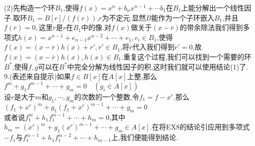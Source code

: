 \documentclass[b5paper]{ctexart}
\begin{document}
(2)先构造一个环$B_1$,使得$f(x)=x^n+b_nx^{n-1}+\cdots b_1$在$B_1$上能分解出一个线性因子.取环$B_1=B[r]/(f(r))$,$r$为不定元.显然$B$能作为一个子环嵌入$B_1$,并且$f(\overline{r})=0,$这里$\overline{r}$是$r$在$B_1$中的像.对$f(x)$做关于$(x-\overline{r})$的带余除法我们得到多项式$h(x)=x^{n-1}+e_{n-1}x^{n-2}+\cdots+e_1,e_i\in B_1$,使得$f(x)=(x-\overline{r})h(x)+r',r'\in B_1$,将$\overline{r}$代入我们得到$r'=0$,故$f(x)=(x-\overline{r})h(x),h(x)\in B_1$.重复这个过程,我们可以找到一个需要的环$B^*$,使得$f,g$可以在$B^*$中完全分解为线性因子的积,这时我们就可以使用结论(1)了.\\
9.(表述来自提示)如果$f\in B[x]$在$A[x]$上整,那么
$f^m+g_1f^{m-1}+\cdots+g_m=0\quad (g_i\in A[x])$\\
设$r$是大于$m$和$g_1,\cdots,g_m$的次数的一个整数,令$f_1=f-x^r.$那么
$(f_1+x^r)^m+g_1(f_1+x^r)^{m-1}+\cdots+g_m=0$\\
或者说$f_1^m+h_1f^{m-1}_1+\cdots+h_m=0$,其中$h_m=(x^r)^m+g_1(x^r)^{m-1}+\cdots+g_m\in A[x]$.在将EX8的结论引应用到多项式$-f_1$与$f_1^{m-1}+h_1f_1^{m-2}+\cdots+h_{m-1}$上,我们便能得到结论.
\end{document}
